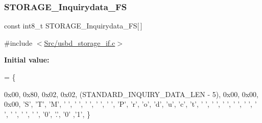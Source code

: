 \subsubsection{\texorpdfstring{S\+T\+O\+R\+A\+G\+E\+\_\+\+Inquirydata\+\_\+\+FS}{STORAGE\_Inquirydata\_FS}}
{\footnotesize\ttfamily const int8\+\_\+t S\+T\+O\+R\+A\+G\+E\+\_\+\+Inquirydata\+\_\+\+FS\mbox{[}$\,$\mbox{]}}



{\ttfamily \#include $<$\mbox{\hyperlink{usbd__storage__if_8c}{Src/usbd\+\_\+storage\+\_\+if.\+c}}$>$}

{\bfseries Initial value\+:}
\begin{DoxyCode}
= \{
  
  
  0x00,     
  0x80,     
  0x02,     
  0x02,
  (STANDARD\_INQUIRY\_DATA\_LEN - 5),
  0x00,
  0x00, 
  0x00,
  \textcolor{charliteral}{'S'}, \textcolor{charliteral}{'T'}, \textcolor{charliteral}{'M'}, \textcolor{charliteral}{' '}, \textcolor{charliteral}{' '}, \textcolor{charliteral}{' '}, \textcolor{charliteral}{' '}, \textcolor{charliteral}{' '}, 
  \textcolor{charliteral}{'P'}, \textcolor{charliteral}{'r'}, \textcolor{charliteral}{'o'}, \textcolor{charliteral}{'d'}, \textcolor{charliteral}{'u'}, \textcolor{charliteral}{'c'}, \textcolor{charliteral}{'t'}, \textcolor{charliteral}{' '}, 
  \textcolor{charliteral}{' '}, \textcolor{charliteral}{' '}, \textcolor{charliteral}{' '}, \textcolor{charliteral}{' '}, \textcolor{charliteral}{' '}, \textcolor{charliteral}{' '}, \textcolor{charliteral}{' '}, \textcolor{charliteral}{' '},
  \textcolor{charliteral}{'0'}, \textcolor{charliteral}{'.'}, \textcolor{charliteral}{'0'} ,\textcolor{charliteral}{'1'},                     
\}
\end{DoxyCode}
